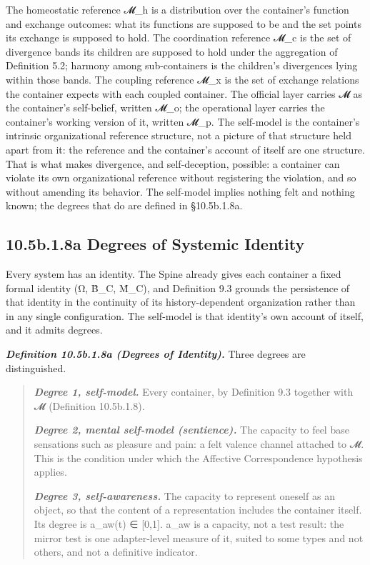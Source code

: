 \documentclass[
]{article}
\begin{document}
The homeostatic reference 𝓜\_h is a distribution over the container's
function and exchange outcomes: what its functions are supposed to be
and the set points its exchange is supposed to hold. The coordination
reference 𝓜\_c is the set of divergence bands its children are supposed
to hold under the aggregation of Definition 5.2; harmony among
sub-containers is the children's divergences lying within those bands.
The coupling reference 𝓜\_x is the set of exchange relations the
container expects with each coupled container. The official layer
carries 𝓜 as the container's self-belief, written 𝓜\_o; the operational
layer carries the container's working version of it, written 𝓜\_p. The
self-model is the container's intrinsic organizational reference
structure, not a picture of that structure held apart from it: the
reference and the container's account of itself are one structure. That
is what makes divergence, and self-deception, possible: a container can
violate its own organizational reference without registering the
violation, and so without amending its behavior. The self-model implies
nothing felt and nothing known; the degrees that do are defined in
§10.5b.1.8a.

\hypertarget{b.1.8a-degrees-of-systemic-identity}{%
\subsection{10.5b.1.8a Degrees of Systemic
Identity}\label{b.1.8a-degrees-of-systemic-identity}}

Every system has an identity. The Spine already gives each container a
fixed formal identity (Ω, B̂\_C, M̂\_C), and Definition 9.3 grounds the
persistence of that identity in the continuity of its history-dependent
organization rather than in any single configuration. The self-model is
that identity's own account of itself, and it admits degrees.

\emph{\textbf{Definition 10.5b.1.8a (Degrees of Identity).}} Three
degrees are distinguished.

\begin{quote}
\emph{\textbf{Degree 1, self-model.}} Every container, by Definition 9.3
together with 𝓜 (Definition 10.5b.1.8).

\emph{\textbf{Degree 2, mental self-model (sentience).}} The capacity to
feel base sensations such as pleasure and pain: a felt valence channel
attached to 𝓜. This is the condition under which the Affective
Correspondence hypothesis applies.

\emph{\textbf{Degree 3, self-awareness.}} The capacity to represent
oneself as an object, so that the content of a representation includes
the container itself. Its degree is a\_aw(t) ∈ {[}0,1{]}. a\_aw is a
capacity, not a test result: the mirror test is one adapter-level
measure of it, suited to some types and not others, and not a definitive
indicator.
\end{quote}
\end{document}
